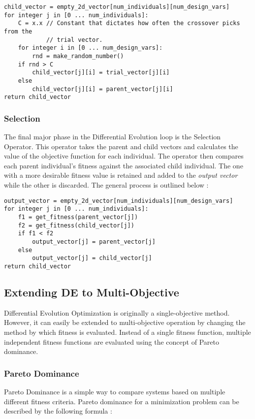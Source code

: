 \begin{lstlisting}[caption=Pseudo-code for the Crossover Operator \cite{diff-evol},captionpos=b]
child_vector = empty_2d_vector[num_individuals][num_design_vars]
for integer j in [0 ... num_individuals]:
    C = x.x // Constant that dictates how often the crossover picks from the
            // trial vector. 
    for integer i in [0 ... num_design_vars]:
        rnd = make_random_number()
	if rnd > C
	    child_vector[j][i] = trial_vector[j][i]
	else
	    child_vector[j][i] = parent_vector[j][i]
return child_vector
\end{lstlisting}

\subsubsection{Selection}
The final major phase in the Differential Evolution loop is the Selection Operator. This operator takes the parent and child vectors and calculates the value of the objective function for each individual. The operator then compares each parent individual's fitness against the associated child individual. The one with a more desirable fitness value is retained and added to the \emph{output vector} while the other is discarded. The general process is outlined below \cite{diff-evol}:

\begin{lstlisting}[label=lst:sel,caption=Pseudocode for the Selection Operator (Assuming a minimization approach) \cite{diff-evol},captionpos=b]
output_vector = empty_2d_vector[num_individuals][num_design_vars]
for integer j in [0 ... num_individuals]:
    f1 = get_fitness(parent_vector[j])
    f2 = get_fitness(child_vector[j])
    if f1 < f2
        output_vector[j] = parent_vector[j]
    else
        output_vector[j] = child_vector[j]
return child_vector
\end{lstlisting}

\subsection{Extending DE to Multi-Objective}
Differential Evolution Optimization is originally a single-objective method. However, it can easily be extended to multi-objective operation by changing the method by which fitness is evaluated. Instead of a single fitness function, multiple independent fitness functions are evaluated using the concept of Pareto dominance. 


\subsubsection{Pareto Dominance}
Pareto Dominance is a simple way to compare systems based on multiple different fitness criteria. Pareto dominance for a minimization problem can be described by the following formula \cite{diff-evol}: 

